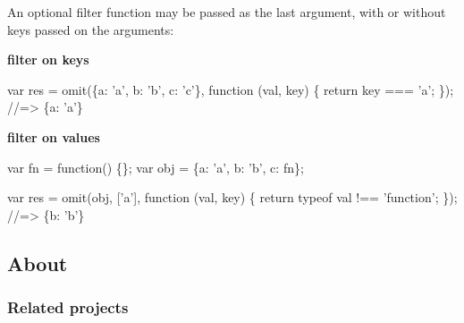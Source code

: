 An optional filter function may be passed as the last argument, with or without keys passed on the arguments\+:

{\bfseries filter on keys}


\begin{DoxyCode}
var res = omit(\{a: 'a', b: 'b', c: 'c'\}, function (val, key) \{
  return key === 'a';
\});
//=> \{a: 'a'\}
\end{DoxyCode}


{\bfseries filter on values}


\begin{DoxyCode}
var fn = function() \{\};
var obj = \{a: 'a', b: 'b', c: fn\};

var res = omit(obj, ['a'], function (val, key) \{
  return typeof val !== 'function';
\});
//=> \{b: 'b'\}
\end{DoxyCode}


\subsection*{About}

\subsubsection*{Related projects}


